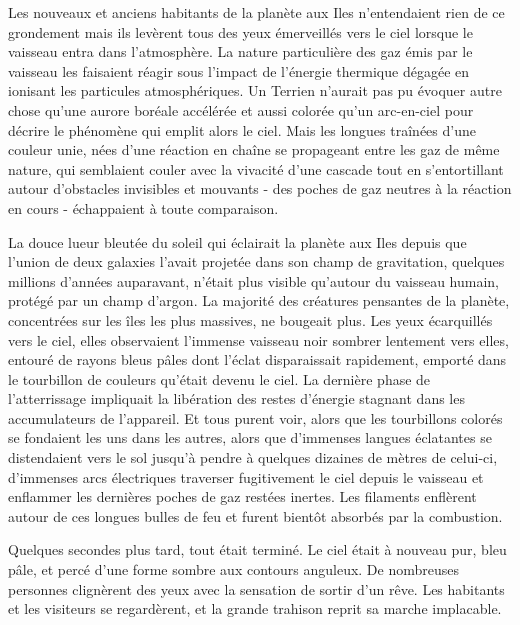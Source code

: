 \documentclass[12pt]{book}
\begin{document}
Les nouveaux et anciens habitants de la planète aux Iles n'entendaient rien de ce grondement mais ils levèrent tous des yeux émerveillés vers le ciel lorsque le vaisseau entra dans l'atmosphère. La nature particulière des gaz émis par le vaisseau les faisaient réagir sous l'impact de l'énergie thermique dégagée en ionisant les particules atmosphériques. Un Terrien n'aurait pas pu évoquer autre chose qu'une aurore boréale accélérée et aussi colorée qu'un arc-en-ciel pour décrire le phénomène qui emplit alors le ciel. Mais les longues traînées d'une couleur unie, nées d'une réaction en chaîne se propageant entre les gaz de même nature, qui semblaient couler avec la vivacité d'une cascade tout en s'entortillant autour d'obstacles invisibles et mouvants - des poches de gaz neutres à la réaction en cours - échappaient à toute comparaison.


La douce lueur bleutée du soleil qui éclairait la planète aux Iles depuis que l'union de deux galaxies l'avait projetée dans son champ de gravitation, quelques millions d'années auparavant, n'était plus visible qu'autour du vaisseau humain, protégé par un champ d'argon. La majorité des créatures pensantes de la planète, concentrées sur les îles les plus massives, ne bougeait plus. Les yeux écarquillés vers le ciel, elles observaient l'immense vaisseau noir sombrer lentement vers elles, entouré de rayons bleus pâles dont l'éclat disparaissait rapidement, emporté dans le tourbillon de couleurs qu'était devenu le ciel. La dernière phase de l'atterrissage impliquait la libération des restes d'énergie stagnant dans les accumulateurs de l'appareil. Et tous purent voir, alors que les tourbillons colorés se fondaient les uns dans les autres, alors que d'immenses langues éclatantes se distendaient vers le sol jusqu'à pendre à quelques dizaines de mètres de celui-ci, d'immenses arcs électriques traverser fugitivement le ciel depuis le vaisseau et enflammer les dernières poches de gaz restées inertes. Les filaments enflèrent autour de ces longues bulles de feu et furent bientôt absorbés par la combustion.


Quelques secondes plus tard, tout était terminé. Le ciel était à nouveau pur, bleu pâle, et percé d'une forme sombre aux contours anguleux. De nombreuses personnes clignèrent des yeux avec la sensation de sortir d'un rêve. Les habitants et les visiteurs se regardèrent, et la grande trahison reprit sa marche implacable.
\end{document}
